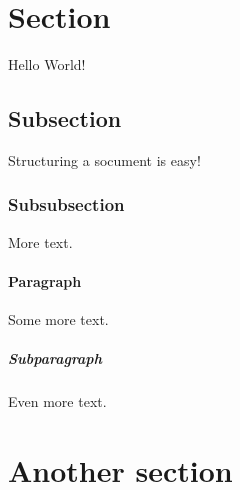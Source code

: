 \documentclass{article}
\begin{document}
\section{Section}

Hello World!

\subsection{Subsection}

Structuring a socument is easy!

\subsubsection{Subsubsection}

More text.

\paragraph{Paragraph}

Some more text.

\subparagraph{Subparagraph}

Even more text.

\section{Another section}
\end{document}
